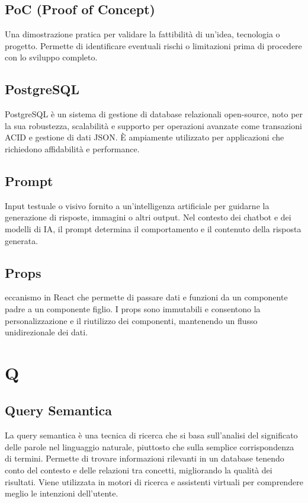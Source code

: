 \documentclass{article}
\begin{document}
\subsection{PoC (Proof of Concept)}
Una dimostrazione pratica per validare la fattibilità di un'idea, tecnologia o progetto. Permette di identificare eventuali rischi o limitazioni prima di procedere con lo sviluppo completo.

\subsection{PostgreSQL}
PostgreSQL è un sistema di gestione di database relazionali open-source, noto per la sua robustezza, scalabilità e supporto per operazioni avanzate come transazioni ACID e gestione di dati JSON. È ampiamente utilizzato per applicazioni che richiedono affidabilità e performance.

\subsection{Prompt}
Input testuale o visivo fornito a un'intelligenza artificiale per guidarne la generazione di risposte, immagini o altri output. Nel contesto dei chatbot e dei modelli di IA, il prompt determina il comportamento e il contenuto della risposta generata.

\subsection{Props}
eccanismo in React che permette di passare dati e funzioni da un componente padre a un componente figlio. I props sono immutabili e consentono la personalizzazione e il riutilizzo dei componenti, mantenendo un flusso unidirezionale dei dati.

\newpage
\section{Q}

\subsection{Query Semantica}
La query semantica è una tecnica di ricerca che si basa sull'analisi del significato delle parole nel linguaggio naturale, piuttosto che sulla semplice corrispondenza di termini. Permette di trovare informazioni rilevanti in un database tenendo conto del contesto e delle relazioni tra concetti, migliorando la qualità dei risultati. Viene utilizzata in motori di ricerca e assistenti virtuali per comprendere meglio le intenzioni dell'utente.
\end{document}
